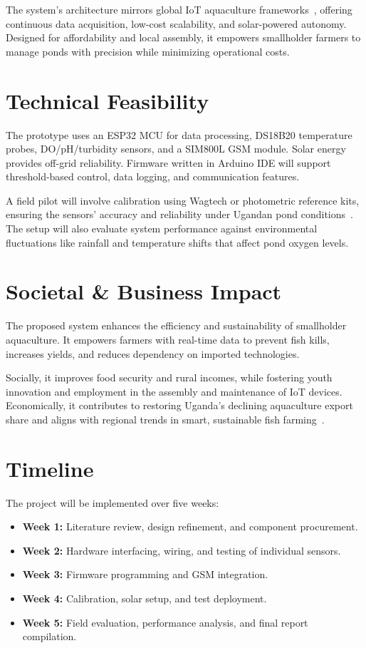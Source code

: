 \documentclass[12pt,a4paper]{article}
\begin{document}
The system's architecture mirrors global IoT aquaculture frameworks~\cite{prapti2022internet, wang2021intelligent}, offering continuous data acquisition, low-cost scalability, and solar-powered autonomy. Designed for affordability and local assembly, it empowers smallholder farmers to manage ponds with precision while minimizing operational costs.

\section{Technical Feasibility}
The prototype uses an ESP32 MCU for data processing, DS18B20 temperature probes, DO/pH/turbidity sensors, and a SIM800L GSM module. Solar energy provides off-grid reliability. Firmware written in Arduino IDE will support threshold-based control, data logging, and communication features.

A field pilot will involve calibration using Wagtech or photometric reference kits, ensuring the sensors' accuracy and reliability under Ugandan pond conditions~\cite{aanyu2020potential}. The setup will also evaluate system performance against environmental fluctuations like rainfall and temperature shifts that affect pond oxygen levels.

\section{Societal \& Business Impact}
The proposed system enhances the efficiency and sustainability of smallholder aquaculture. It empowers farmers with real-time data to prevent fish kills, increases yields, and reduces dependency on imported technologies.  

Socially, it improves food security and rural incomes, while fostering youth innovation and employment in the assembly and maintenance of IoT devices. Economically, it contributes to restoring Uganda's declining aquaculture export share and aligns with regional trends in smart, sustainable fish farming~\cite{byabasaija2025unlocking, clough2020innovative}.

\section{Timeline}
The project will be implemented over five weeks:
\begin{itemize}
    \item \textbf{Week 1:} Literature review, design refinement, and component procurement.
    \item \textbf{Week 2:} Hardware interfacing, wiring, and testing of individual sensors.
    \item \textbf{Week 3:} Firmware programming and GSM integration.
    \item \textbf{Week 4:} Calibration, solar setup, and test deployment.
    \item \textbf{Week 5:} Field evaluation, performance analysis, and final report compilation.
\end{itemize}
\end{document}
